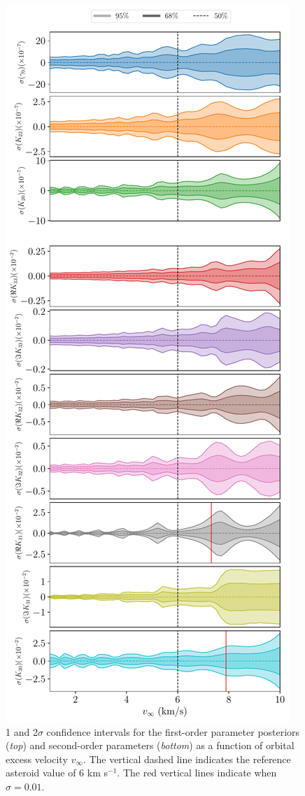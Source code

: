 \documentclass[fleqn,usenatbib]{mnras}
\begin{document}
\begin{figure}
  \centering
  \includegraphics[height=0.89\textheight]{figs/scan-vex.pdf}
  \caption{1 and 2$\sigma$ confidence intervals for the first-order parameter posteriors (\textit{top}) and second-order parameters (\textit{bottom}) as a function of orbital excess velocity $v_\infty$. The vertical dashed line indicates the reference asteroid value of 6 km s$^{-1}$. The red vertical lines indicate when $\sigma = 0.01$.}
  \label{fig:scan-vex}
\end{figure}
\end{document}
